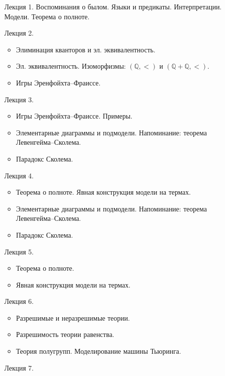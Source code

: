 \begin{enumerate}
    \item[Лекция 1.] Воспоминания о былом. Языки и предикаты. Интерпретации. Модели. Теорема о полноте.
    \item[Лекция 2.] 
        \begin{itemize}
            \item Элиминация кванторов и эл. эквивалентность.
            \item Эл. эквивалентность. Изоморфизмы: $(\mathbb{Q}, <)$ и $(\mathbb{Q} + \mathbb{Q}, <)$.
            \item Игры Эренфойхта--Фраиссе. 
        \end{itemize}
    \item[Лекция 3.]
        \begin{itemize}
            \item Игры Эренфойхта--Фраиссе. Примеры.
            \item Элементарные диаграммы и подмодели. Напоминание: теорема Левенгейма--Сколема.
            \item Парадокс Сколема.
        \end{itemize}
    \item[Лекция 4.]
        \begin{itemize}
            \item Теорема о полноте. Явная конструкция модели на термах.
            \item Элементарные диаграммы и подмодели. Напоминание: теорема Левенгейма--Сколема.
            \item Парадокс Сколема.
        \end{itemize}
    \item[Лекция 5.]
        \begin{itemize}
            \item Теорема о полноте.
            \item Явная конструкция модели на термах.
        \end{itemize}        
    \item[Лекция 6.]
        \begin{itemize}
            \item Разрешимые и неразрешимые теории.
            \item Разрешимость теории равенства.
            \item Теория полугрупп. Моделирование машины Тьюринга.
        \end{itemize}
    \item[Лекция 7.]

\end{enumerate}
